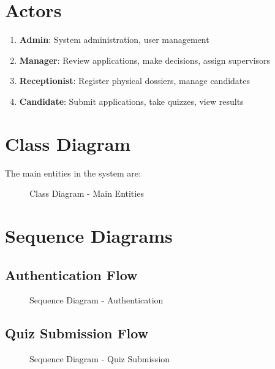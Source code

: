 \documentclass[12pt,a4paper]{report}
\begin{document}
\section{Actors}
\begin{enumerate}
    \item \textbf{Admin}: System administration, user management
    \item \textbf{Manager}: Review applications, make decisions, assign supervisors
    \item \textbf{Receptionist}: Register physical dossiers, manage candidates
    \item \textbf{Candidate}: Submit applications, take quizzes, view results
\end{enumerate}

\section{Class Diagram}
The main entities in the system are:

\begin{figure}[H]
\caption{Class Diagram - Main Entities}
\end{figure}

\section{Sequence Diagrams}

\subsection{Authentication Flow}
\begin{figure}[H]
\caption{Sequence Diagram - Authentication}
\end{figure}

\subsection{Quiz Submission Flow}
\begin{figure}[H]
\caption{Sequence Diagram - Quiz Submission}
\end{figure}

\end{document}
